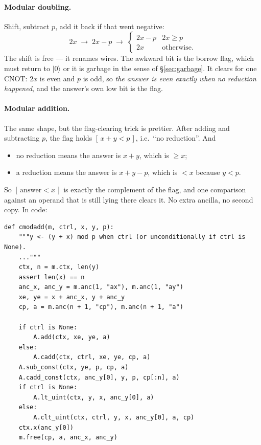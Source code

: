 \documentclass[11pt]{article}
\renewcommand{\ket}[1]{\lvert #1 \rangle}
\theoremstyle{plain}
\theoremstyle{remark}
\begin{document}
\paragraph{Modular doubling.}
Shift, subtract $p$, add it back if that went negative:
\[
2x \;\longrightarrow\; 2x-p \;\longrightarrow\; \begin{cases} 2x-p & 2x\ge p\\ 2x & \text{otherwise.}\end{cases}
\]
The shift is free --- it renames wires. The awkward bit is the borrow flag, which must return to
$\ket0$ or it is garbage in the sense of \S\ref{sec:garbage}. It clears for one CNOT: $2x$ is even
and $p$ is odd, so \emph{the answer is even exactly when no reduction happened}, and the answer's
own low bit is the flag.

\paragraph{Modular addition.} The same shape, but the flag-clearing trick is prettier.
After adding and subtracting $p$, the flag holds $[\,x+y<p\,]$, i.e.\ ``no reduction''. And
\begin{itemize}\setlength\itemsep{1pt}
\item no reduction means the answer is $x+y$, which is $\ge x$;
\item a reduction means the answer is $x+y-p$, which is $<x$ because $y<p$.
\end{itemize}
So $[\,\text{answer}<x\,]$ is exactly the complement of the flag, and one comparison against an
operand that is still lying there clears it. No extra ancilla, no second copy. In code:

\begin{lstlisting}
def cmodadd(m, ctrl, x, y, p):
    """y <- (y + x) mod p when ctrl (or unconditionally if ctrl is None).
    ..."""
    ctx, n = m.ctx, len(y)
    assert len(x) == n
    anc_x, anc_y = m.anc(1, "ax"), m.anc(1, "ay")
    xe, ye = x + anc_x, y + anc_y
    cp, a = m.anc(n + 1, "cp"), m.anc(n + 1, "a")

    if ctrl is None:
        A.add(ctx, xe, ye, a)
    else:
        A.cadd(ctx, ctrl, xe, ye, cp, a)
    A.sub_const(ctx, ye, p, cp, a)
    A.cadd_const(ctx, anc_y[0], y, p, cp[:n], a)
    if ctrl is None:
        A.lt_uint(ctx, y, x, anc_y[0], a)
    else:
        A.clt_uint(ctx, ctrl, y, x, anc_y[0], a, cp)
    ctx.x(anc_y[0])
    m.free(cp, a, anc_x, anc_y)
\end{lstlisting}
\end{document}
